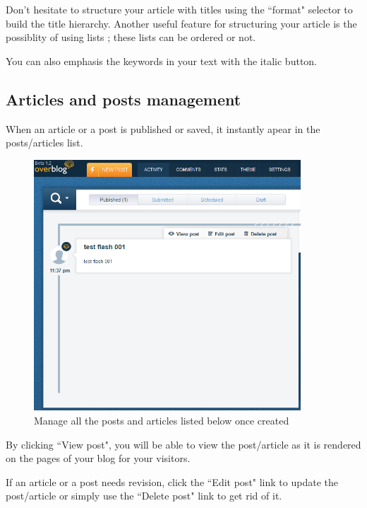 \documentclass[a4paper,10pt]{article}
\begin{document}
Don't hesitate to structure your article with titles using the ``format" selector to build the title hierarchy. Another useful feature for structuring your article is the possiblity of using lists ; these lists can be ordered or not. 

You can also emphasis the keywords in your text with the italic button. 

\newpage

\subsection{Articles and posts management}

When an article or a post is published or saved, it instantly apear in the posts/articles list. 

\begin{figure}[H]
    \center
	\includegraphics[width=10cm]{Images/view_edit_delete_001.png}
    \caption{Manage all the posts and articles listed below once created}
\end{figure}

By clicking ``View post", you will be able to view the post/article as it is rendered on the pages of your blog for your visitors. 

If an article or a post needs revision, click the ``Edit post" link to update the post/article or simply use the ``Delete post" link to get rid of it. 
\end{document}
